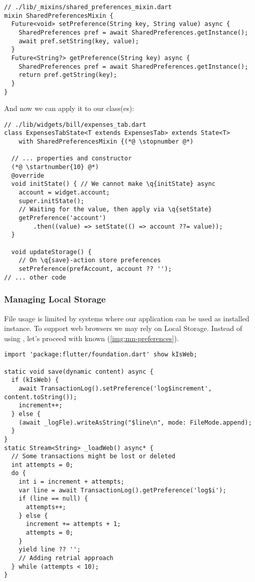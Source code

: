 \begin{lstlisting}
// ./lib/_mixins/shared_preferences_mixin.dart
mixin SharedPreferencesMixin {
  Future<void> setPreference(String key, String value) async {
    SharedPreferences pref = await SharedPreferences.getInstance();
    await pref.setString(key, value);
  }
  Future<String?> getPreference(String key) async {
    SharedPreferences pref = await SharedPreferences.getInstance();
    return pref.getString(key);
  }
}
\end{lstlisting}

\noindent And now we can apply it to our class(es):

\begin{lstlisting}
// ./lib/widgets/bill/expenses_tab.dart
class ExpensesTabState<T extends ExpensesTab> extends State<T>
    with SharedPreferencesMixin {(*@ \stopnumber @*)

  // ... properties and constructor
  (*@ \startnumber{10} @*)
  @override
  void initState() { // We cannot make \q{initState} async
    account = widget.account;
    super.initState();
    // Waiting for the value, then apply via \q{setState}
    getPreference('account')
        .then((value) => setState(() => account ??= value));
  }

  void updateStorage() {
    // On \q{save}-action store preferences
    setPreference(prefAccount, account ?? '');
// ... other code
\end{lstlisting}


\subsubsection{Managing Local Storage}

File usage is limited by systems where our application can be used as installed instance. To support web browsers
we may rely on Local Storage. Instead of using , let's proceed with known  
(\cref{img:mn-preferences}).

\begin{lstlisting}
import 'package:flutter/foundation.dart' show kIsWeb;

static void save(dynamic content) async {
  if (kIsWeb) {
    await TransactionLog().setPreference('log$increment', content.toString());
    increment++;
  } else {
    (await _logFle).writeAsString("$line\n", mode: FileMode.append);
  }
}
static Stream<String> _loadWeb() async* {
  // Some transactions might be lost or deleted
  int attempts = 0;
  do {
    int i = increment + attempts;
    var line = await TransactionLog().getPreference('log$i');
    if (line == null) {
      attempts++;
    } else {
      increment += attempts + 1;
      attempts = 0;
    }
    yield line ?? '';
    // Adding retrial approach
  } while (attempts < 10);
}
\end{lstlisting}


